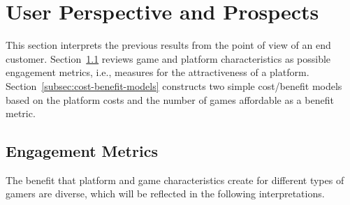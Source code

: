 \section{User Perspective and Prospects}
\label{sec:engagement}

This section interprets the previous results from the point of view of an end customer. Section~\ref{subsec:metrics} reviews game and platform characteristics as possible engagement metrics, i.e., measures for the attractiveness of a platform. Section~\ref{subsec:cost-benefit-models} constructs two simple cost/benefit models based on the platform costs and the number of games affordable as a benefit metric.


\subsection{Engagement Metrics}\label{subsec:metrics}

The benefit that platform and game characteristics create for different types of gamers are diverse, which will be reflected in the following interpretations.




